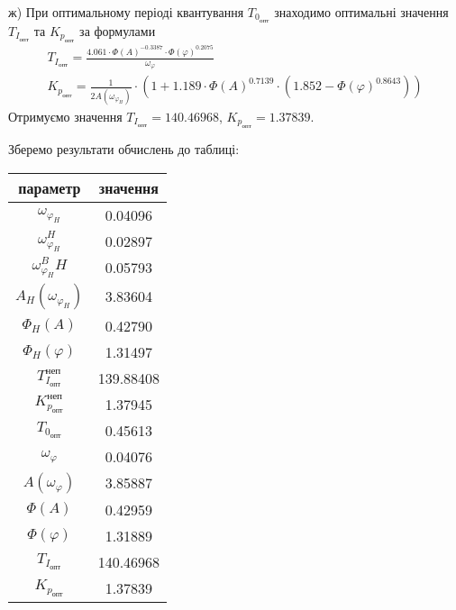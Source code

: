 ж)\; При оптимальному періоді квантування $T_{0_{\text{опт}}}$ знаходимо 
оптимальні значення $T_{I_{\text{опт}}}$ та $K_{p_{\text{опт}}}$ за формулами
\begin{gather}
    T_{I_{\text{опт}}} = 
    \frac{4.061 \cdot \Phi(A)^{-0.3387} \cdot \Phi(\varphi)^{0.2075}}{\omega_{\varphi}} \\
    K_{p_{\text{опт}}} = \frac{1}{2 A\left(\omega_{\varphi_H}\right)}
    \cdot \left(
        1 + 1.189 \cdot \Phi(A)^{0.7139}\cdot \left(1.852 - \Phi(\varphi)^{0.8643}\right)
    \right)
\end{gather}
Отримуємо значення
$T_{I_{\text{опт}}} = 140.46968$, $K_{p_{\text{опт}}} = 1.37839$.

Зберемо результати обчислень до таблиці:
\begin{center}
    \begin{tabular}{|c|c|}
        \hline
        параметр & значення \\
        \hline
        $\omega_{\varphi_H}$ & 0.04096\\
        \hline
        $\omega_{\varphi_H}^H$ & 0.02897\\
        \hline
        $\omega_{\varphi_H}^BH$ & 0.05793\\
        \hline
        $A_H\left(\omega_{\varphi_H}\right)$ & 3.83604\\
        \hline
        $\Phi_H(A)$ & 0.42790\\
        \hline
        $\Phi_H(\varphi)$ & 1.31497\\
        \hline
        $T_{I_{\text{опт}}}^{\text{неп}}$ & 139.88408\\
        \hline
        $K_{p_{\text{опт}}}^{\text{неп}}$ & 1.37945\\
        \hline
        $T_{0_{\text{опт}}}$ & 0.45613\\
        \hline
        $\omega_{\varphi}$ & 0.04076\\
        \hline
        $A\left(\omega_{\varphi}\right)$ & 3.85887\\
        \hline
        $\Phi(A)$ & 0.42959\\
        \hline
        $\Phi(\varphi)$ & 1.31889\\
        \hline
        $T_{I_{\text{опт}}}$ & 140.46968\\
        \hline
        $K_{p_{\text{опт}}}$ & 1.37839\\
        \hline
     \end{tabular}
\end{center}


